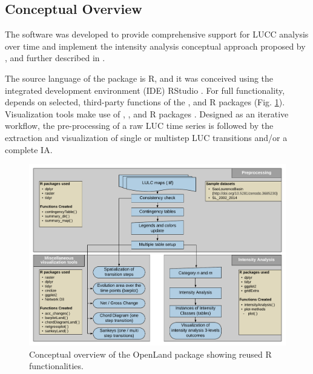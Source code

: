 \hypertarget{conceptual-overview}{%
\subsection{Conceptual Overview}\label{conceptual-overview}}

The software was developed to provide comprehensive support for LUCC
analysis over time and implement the intensity analysis conceptual
approach proposed by \citet{Aldwaik2012}, and further described in
\citet{Aldwaik2013}.

The source language of the  package \citep{Exavier2020} is R,
and it was conceived using the integrated development environment (IDE)
RStudio \citep{RStudioTeam2016}. For full functionality, 
depends on selected, third-party functions of the ,
 and  R packages
\citep{Hijmans2019, Wickham2019, Wickham2019a} (Fig.
\ref{fig:conception}). Visualization tools make use of ,
,  and
 R packages
\citep{Allaire2017, Auguie2017, Gu2014, Wickham2016}. Designed
as an iterative workflow, the pre-processing of a raw LUC time series is
followed by the extraction and visualization of single or multistep LUC
transitions and/or a complete IA.

\begin{Schunk}
\begin{figure}[h]

{\centering \includegraphics[width=0.8\linewidth,trim={0 0.5cm 0 0.5cm},clip]{figures/conception_overview.pdf} 

}

\caption[Conceptual overview of the OpenLand package showing reused R functionalities]{Conceptual overview of the OpenLand package showing reused R functionalities.}\label{fig:conception}
\end{figure}
\end{Schunk}

